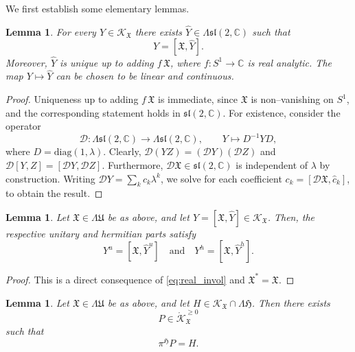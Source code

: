 \documentclass[12pt,a4paper]{amsart}
\newtheorem{lemma}[theorem]{Lemma}
\theoremstyle{definition}
\theoremstyle{remark}
\newcommand{\C}{\mathbb C}
\begin{document}
We first establish some
elementary lemmas.

\begin{lemma}\label{lem:YhatY}
For every $Y\in\mathcal K_{\mathfrak X}$ there exists
$\hat Y\in \Lambda\mathfrak{sl}(2,\C)$ such that
\[
Y=[\mathfrak X,\hat Y].
\]
Moreover, $\hat Y$ is unique up to adding $f\,\mathfrak X$, where
$f\colon S^1\to\C$ is real analytic.
The map $Y\mapsto \hat Y$ can be chosen to be linear and continuous.
\end{lemma}

\begin{proof}
Uniqueness up to adding $f\,\mathfrak X$ is immediate, since $\mathfrak X$ is
non--vanishing on $S^1$, and the corresponding statement holds in
$\mathfrak{sl}(2,\C)$.
For existence, consider the operator
\begin{equation}\label{def:Dcim}
\mathcal D\colon
\Lambda\mathfrak{sl}(2,\C)\to \Lambda\mathfrak{sl}(2,\C),
\qquad
Y\longmapsto D^{-1}YD,
\end{equation}
where $D=\mathrm{diag}(1,\lambda)$.
Clearly, $\mathcal D(YZ)=(\mathcal D Y)(\mathcal D Z)$ and
$\mathcal D[Y,Z]=[\mathcal D Y,\mathcal D Z]$.
Furthermore, $\mathcal D\mathfrak X\in\mathfrak{sl}(2,\C)$ is independent of $\lambda$ by construction.
Writing $\mathcal D Y=\sum_k c_k\lambda^k$, we 
solve for each coefficient $c_k=[\mathcal D\mathfrak X, \hat c_k]$, to obtain the result.
\end{proof}


\begin{lemma}\label{lem.red}
Let $\mathfrak X\in\Lambda\mathfrak U$ be as above, and let
$Y=[\mathfrak X,\hat Y]\in\mathcal K_\mathfrak X$.
Then, the respective unitary and hermitian parts satisfy
\[
Y^u=[\mathfrak X,\hat Y^u]
\quad\text{and}\quad
Y^h=[\mathfrak X,\hat Y^h].
\]
\end{lemma}

\begin{proof}
This is a direct consequence of \eqref{eq:real_invol} and $\mathfrak X^*=\mathfrak X$.
\end{proof}

\begin{lemma}\label{lem:existPp}
Let $\mathfrak X\in\Lambda\mathfrak U$ be as above, and let
$H
\in\mathcal K_\mathfrak X\cap\Lambda\mathfrak H$. 
Then there exists
\[
 P\in \mathring{\mathcal K}_\mathfrak X^{\geq0}
\]
such that
\[\pi^\mathfrak HP=H.\]
\end{lemma}
\end{document}
